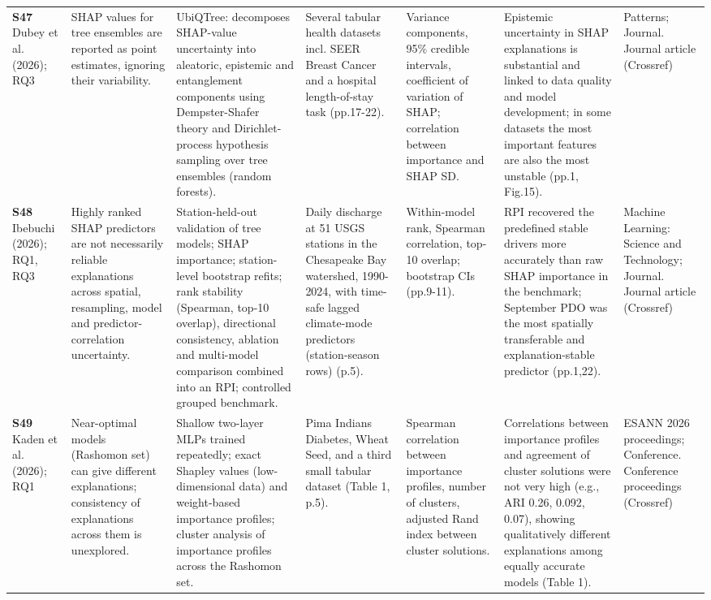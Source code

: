 \begin{longtable}{@{}P{1.55cm}P{2.9cm}P{4.5cm}P{3.2cm}P{3.4cm}P{4.6cm}P{3.6cm}@{}}
\textbf{S47} \cite{S47} Dubey et al. (2026); RQ3 & SHAP values for tree ensembles are reported as point estimates, ignoring their variability. & UbiQTree: decomposes SHAP-value uncertainty into aleatoric, epistemic and entanglement components using Dempster-Shafer theory and Dirichlet-process hypothesis sampling over tree ensembles (random forests). & Several tabular health datasets incl. SEER Breast Cancer and a hospital length-of-stay task (pp.17-22). & Variance components, 95\% credible intervals, coefficient of variation of SHAP; correlation between importance and SHAP SD. & Epistemic uncertainty in SHAP explanations is substantial and linked to data quality and model development; in some datasets the most important features are also the most unstable (pp.1, Fig.15). & Patterns; Journal. Journal article (Crossref) \\
\textbf{S48} \cite{S48} Ibebuchi (2026); RQ1, RQ3 & Highly ranked SHAP predictors are not necessarily reliable explanations across spatial, resampling, model and predictor-correlation uncertainty. & Station-held-out validation of tree models; SHAP importance; station-level bootstrap refits; rank stability (Spearman, top-10 overlap), directional consistency, ablation and multi-model comparison combined into an RPI; controlled grouped benchmark. & Daily discharge at 51 USGS stations in the Chesapeake Bay watershed, 1990-2024, with time-safe lagged climate-mode predictors (station-season rows) (p.5). & Within-model rank, Spearman correlation, top-10 overlap; bootstrap CIs (pp.9-11). & RPI recovered the predefined stable drivers more accurately than raw SHAP importance in the benchmark; September PDO was the most spatially transferable and explanation-stable predictor (pp.1,22). & Machine Learning: Science and Technology; Journal. Journal article (Crossref) \\
\textbf{S49} \cite{S49} Kaden et al. (2026); RQ1 & Near-optimal models (Rashomon set) can give different explanations; consistency of explanations across them is unexplored. & Shallow two-layer MLPs trained repeatedly; exact Shapley values (low-dimensional data) and weight-based importance profiles; cluster analysis of importance profiles across the Rashomon set. & Pima Indians Diabetes, Wheat Seed, and a third small tabular dataset (Table 1, p.5). & Spearman correlation between importance profiles, number of clusters, adjusted Rand index between cluster solutions. & Correlations between importance profiles and agreement of cluster solutions were not very high (e.g., ARI 0.26, 0.092, 0.07), showing qualitatively different explanations among equally accurate models (Table 1). & ESANN 2026 proceedings; Conference. Conference proceedings (Crossref) \\

\end{longtable}
